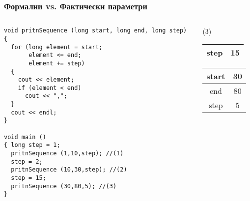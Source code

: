 \documentclass{beamer}
\begin{document}
\begin{frame}[fragile]
\frametitle{Формални vs. Фактически параметри}



\begin{columns}[t]
  \begin{column}{0.75\textwidth}

\begin{lstlisting}
void pritnSequence (long start, long end, long step)
{
  for (long element = start;
       element <= end;
       element += step)
  {
    cout << element;
    if (element < end)
      cout << ",";
  }
  cout << endl;
}

void main ()
{ long step = 1;
  pritnSequence (1,10,step); //(1)
  step = 2;
  pritnSequence (10,30,step); //(2)
  step = 15;
  pritnSequence (30,80,5); //(3)
}
\end{lstlisting}


  \end{column}
  \begin{column}{0.25\textwidth}

    \alert{(3)}

    \begin{tabular}{|c|c|}
    step & 15 \\\hline

    \end{tabular}
    \pause
    \begin{tabular}{|c|c|}
    start & 30 \\\hline
    end & 80 \\\hline
    step & 5 \\\hline

    \end{tabular}
  \end{column}
\end{columns}

\end{frame}
\end{document}
